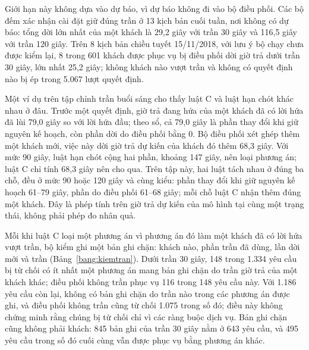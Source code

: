 Giới hạn này không dựa vào dự báo, vì dự báo không đi vào bộ điều phối. Các bộ đếm xác nhận cài đặt giữ đúng trần ở
13 kịch bản cuối tuần, nơi không có dự báo: tổng dời lớn nhất của một khách là 29,2 giây với trần 30 giây và 116,5
giây với trần 120 giây. Trên 8 kịch bản chiều tuyết 15/11/2018, với lưu ý bộ chạy chưa được kiểm lại, 8 trong 601
khách được phục vụ bị điều phối dời giờ trả dưới trần 30 giây, lớn nhất 25,2 giây; không khách nào vượt trần và không
có quyết định nào bị ép trong 5.067 lượt quyết định.

Một ví dụ trên tập chỉnh trần buổi sáng cho thấy luật C và luật hạn chót khác nhau ở đâu. Trước một quyết định, giờ
trả đang hứa của một khách đã có lời hứa đã lùi 79,0 giây so với lời hứa đầu; theo sổ, cả 79,0 giây là phần thay đổi
khi giữ nguyên kế hoạch, còn phần dời do điều phối bằng 0. Bộ điều phối xét ghép thêm một khách mới, việc này dời
giờ trả dự kiến của khách đó thêm 68,3 giây. Với mức 90 giây, luật hạn chót cộng hai phần, khoảng 147 giây, nên loại
phương án; luật C chỉ tính 68,3 giây nên cho qua. Trên tập này, hai luật tách nhau ở đúng ba chỗ, đều ở mức 90 hoặc
120 giây và cùng kiểu: phần thay đổi khi giữ nguyên kế hoạch 61--79 giây, phần do điều phối 61--68 giây; mỗi chỗ luật
C nhận thêm đúng một khách. Đây là phép tính trên giờ trả dự kiến của mô hình tại cùng một trạng thái, không phải
phép đo nhân quả.

Mỗi khi luật C loại một phương án vì phương án đó làm một khách đã có lời hứa vượt trần, bộ kiểm ghi một bản ghi
chặn: khách nào, phần trần đã dùng, lần dời mới và trần (Bảng~\ref{bang:kiemtran}). Dưới trần 30 giây, 148 trong
1.334 yêu cầu bị từ chối có ít nhất một phương án mang bản ghi chặn do trần giờ trả của một khách khác; điều phối không
trần phục vụ 116 trong 148 yêu cầu này. Với 1.186 yêu cầu còn lại, không có bản ghi chặn do trần nào trong các phương
án được ghi, và điều phối không trần cũng từ chối 1.075 trong số đó; điều này không chứng minh rằng chúng bị từ chối
chỉ vì các ràng buộc dịch vụ. Bản ghi chặn cũng không phải khách: 845 bản ghi của trần 30 giây nằm ở 643 yêu cầu, và
495 yêu cầu trong số đó cuối cùng vẫn được phục vụ bằng phương án khác.

